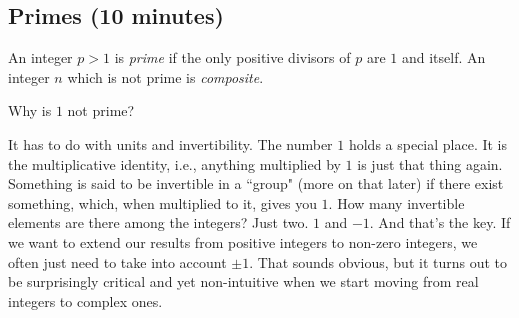 \documentclass[letterpaper, 11 pt]{article}
\begin{document}
\subsection{Primes (10 minutes)}
\begin{defn}
An integer $p>1$ is \emph{prime} if the only positive divisors of $p$ are $1$ and itself. An integer $n$ which is not prime is \emph{composite}. 
\end{defn}

Why is $1$ not prime?

It has to do with units and invertibility. The number $1$ holds a special place. It is the multiplicative identity, i.e., anything multiplied by $1$ is just that thing again. Something is said to be invertible in a ``group" (more on that later) if there exist something, which, when multiplied to it, gives you $1$. How many invertible elements are there among the integers? Just two. $1$ and $-1$. And that's the key. If we want to extend our results from positive integers to non-zero integers, we often just need to take into account $\pm 1$. That sounds obvious, but it turns out to be surprisingly critical and yet non-intuitive when we start moving from real integers to complex ones.
\end{document}
